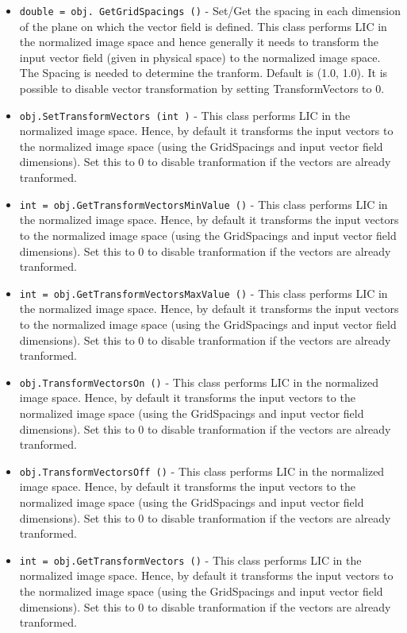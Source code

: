 \begin{itemize}
\item  \verb|double = obj. GetGridSpacings ()| -  Set/Get the spacing in each dimension of the plane on which the vector 
 field is defined. This class performs LIC in the normalized image space
 and hence generally it needs to transform the input vector field (given 
 in physical space) to the normalized image space. The Spacing is needed
 to determine the tranform. Default is (1.0, 1.0). It is possible to 
 disable vector transformation by setting TransformVectors to 0.

\item  \verb|obj.SetTransformVectors (int )| -  This class performs LIC in the normalized image space. Hence, by default
 it transforms the input vectors to the normalized image space (using the
 GridSpacings and input vector field dimensions). Set this to 0 to disable
 tranformation if the vectors are already tranformed.

\item  \verb|int = obj.GetTransformVectorsMinValue ()| -  This class performs LIC in the normalized image space. Hence, by default
 it transforms the input vectors to the normalized image space (using the
 GridSpacings and input vector field dimensions). Set this to 0 to disable
 tranformation if the vectors are already tranformed.

\item  \verb|int = obj.GetTransformVectorsMaxValue ()| -  This class performs LIC in the normalized image space. Hence, by default
 it transforms the input vectors to the normalized image space (using the
 GridSpacings and input vector field dimensions). Set this to 0 to disable
 tranformation if the vectors are already tranformed.

\item  \verb|obj.TransformVectorsOn ()| -  This class performs LIC in the normalized image space. Hence, by default
 it transforms the input vectors to the normalized image space (using the
 GridSpacings and input vector field dimensions). Set this to 0 to disable
 tranformation if the vectors are already tranformed.

\item  \verb|obj.TransformVectorsOff ()| -  This class performs LIC in the normalized image space. Hence, by default
 it transforms the input vectors to the normalized image space (using the
 GridSpacings and input vector field dimensions). Set this to 0 to disable
 tranformation if the vectors are already tranformed.

\item  \verb|int = obj.GetTransformVectors ()| -  This class performs LIC in the normalized image space. Hence, by default
 it transforms the input vectors to the normalized image space (using the
 GridSpacings and input vector field dimensions). Set this to 0 to disable
 tranformation if the vectors are already tranformed.


\end{itemize}
